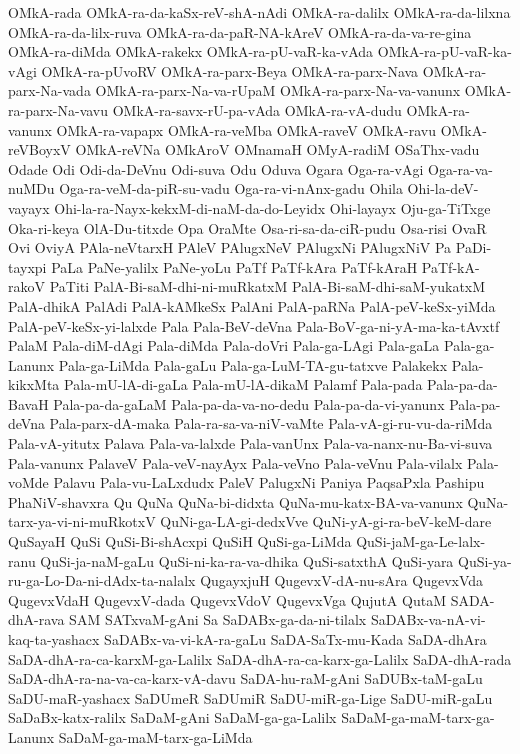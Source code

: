 {OMkA-rada
OMkA-ra-da-kaSx-reV-shA-nAdi
OMkA-ra-dalilx
OMkA-ra-da-lilxna
OMkA-ra-da-lilx-ruva
OMkA-ra-da-paR-NA-kAreV
OMkA-ra-da-va-re-gina
OMkA-ra-diMda
OMkA-rakekx
OMkA-ra-pU-vaR-ka-vAda
OMkA-ra-pU-vaR-ka-vAgi
OMkA-ra-pUvoRV
OMkA-ra-parx-Beya
OMkA-ra-parx-Nava
OMkA-ra-parx-Na-vada
OMkA-ra-parx-Na-va-rUpaM
OMkA-ra-parx-Na-va-vanunx
OMkA-ra-parx-Na-vavu
OMkA-ra-savx-rU-pa-vAda
OMkA-ra-vA-dudu
OMkA-ra-vanunx
OMkA-ra-vapapx
OMkA-ra-veMba
OMkA-raveV
OMkA-ravu
OMkA-reVBoyxV
OMkA-reVNa
OMkAroV
OMnamaH
OMyA-radiM
OSaThx-vadu
Odade
Odi
Odi-da-DeVnu
Odi-suva
Odu
Oduva
Ogara
Oga-ra-vAgi
Oga-ra-va-nuMDu
Oga-ra-veM-da-piR-su-vadu
Oga-ra-vi-nAnx-gadu
Ohila
Ohi-la-deV-vayayx
Ohi-la-ra-Nayx-kekxM-di-naM-da-do-Leyidx
Ohi-layayx
Oju-ga-TiTxge
Oka-ri-keya
OlA-Du-titxde
Opa
OraMte
Osa-ri-sa-da-ciR-pudu
Osa-risi
OvaR
Ovi
OviyA
PAla-neVtarxH
PAleV
PAlugxNeV
PAlugxNi
PAlugxNiV
Pa
PaDi-tayxpi
PaLa
PaNe-yalilx
PaNe-yoLu
PaTf
PaTf-kAra
PaTf-kAraH
PaTf-kA-rakoV
PaTiti
PalA-Bi-saM-dhi-ni-muRkatxM
PalA-Bi-saM-dhi-saM-yukatxM
PalA-dhikA
PalAdi
PalA-kAMkeSx
PalAni
PalA-paRNa
PalA-peV-keSx-yiMda
PalA-peV-keSx-yi-lalxde
Pala
Pala-BeV-deVna
Pala-BoV-ga-ni-yA-ma-ka-tAvxtf
PalaM
Pala-diM-dAgi
Pala-diMda
Pala-doVri
Pala-ga-LAgi
Pala-gaLa
Pala-ga-Lanunx
Pala-ga-LiMda
Pala-gaLu
Pala-ga-LuM-TA-gu-tatxve
Palakekx
Pala-kikxMta
Pala-mU-lA-di-gaLa
Pala-mU-lA-dikaM
Palamf
Pala-pada
Pala-pa-da-BavaH
Pala-pa-da-gaLaM
Pala-pa-da-va-no-dedu
Pala-pa-da-vi-yanunx
Pala-pa-deVna
Pala-parx-dA-maka
Pala-ra-sa-va-niV-vaMte
Pala-vA-gi-ru-vu-da-riMda
Pala-vA-yitutx
Palava
Pala-va-lalxde
Pala-vanUnx
Pala-va-nanx-nu-Ba-vi-suva
Pala-vanunx
PalaveV
Pala-veV-nayAyx
Pala-veVno
Pala-veVnu
Pala-vilalx
Pala-voMde
Palavu
Pala-vu-LaLxdudx
PaleV
PalugxNi
Paniya
PaqsaPxla
Pashipu
PhaNiV-shavxra
Qu
QuNa
QuNa-bi-didxta
QuNa-mu-katx-BA-va-vanunx
QuNa-tarx-ya-vi-ni-muRkotxV
QuNi-ga-LA-gi-dedxVve
QuNi-yA-gi-ra-beV-keM-dare
QuSayaH
QuSi
QuSi-Bi-shAcxpi
QuSiH
QuSi-ga-LiMda
QuSi-jaM-ga-Le-lalx-ranu
QuSi-ja-naM-gaLu
QuSi-ni-ka-ra-va-dhika
QuSi-satxthA
QuSi-yara
QuSi-ya-ru-ga-Lo-Da-ni-dAdx-ta-nalalx
QugayxjuH
QugevxV-dA-nu-sAra
QugevxVda
QugevxVdaH
QugevxV-dada
QugevxVdoV
QugevxVga
QujutA
QutaM
SADA-dhA-rava
SAM
SATxvaM-gAni
Sa
SaDABx-ga-da-ni-tilalx
SaDABx-va-nA-vi-kaq-ta-yashacx
SaDABx-va-vi-kA-ra-gaLu
SaDA-SaTx-mu-Kada
SaDA-dhAra
SaDA-dhA-ra-ca-karxM-ga-Lalilx
SaDA-dhA-ra-ca-karx-ga-Lalilx
SaDA-dhA-rada
SaDA-dhA-ra-na-va-ca-karx-vA-davu
SaDA-hu-raM-gAni
SaDUBx-taM-gaLu
SaDU-maR-yashacx
SaDUmeR
SaDUmiR
SaDU-miR-ga-Lige
SaDU-miR-gaLu
SaDaBx-katx-ralilx
SaDaM-gAni
SaDaM-ga-ga-Lalilx
SaDaM-ga-maM-tarx-ga-Lanunx
SaDaM-ga-maM-tarx-ga-LiMda
}
